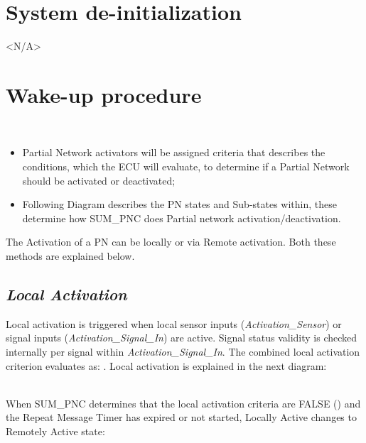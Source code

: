 \section{System de-initialization}
<N/A>
\newline
\section{Wake-up procedure}
\\
\begin{itemize}
	\item Partial Network activators will be assigned criteria that describes the conditions, which the ECU will evaluate, to determine if a Partial Network should be activated or deactivated;
	\item Following Diagram describes the PN states and Sub-states within, these determine how SUM_PNC does Partial network activation/deactivation.
\end{itemize}
\noindent
The Activation of a PN can be locally or via Remote activation. Both these methods are explained below.


\subsection{\textit{Local Activation}}
\label{subsection:LocalActivation}

Local activation is triggered when local sensor inputs (\textit{Activation\_Sensor}) or signal inputs (\textit{Activation\_Signal\_In}) are active. Signal status validity is checked internally per signal within \textit{Activation\_Signal\_In}. The combined local activation criterion evaluates as: . Local activation is explained in the next diagram:


        

\\
When SUM\_PNC determines that the local activation criteria are FALSE () and the Repeat Message Timer has expired or not started, Locally Active changes to Remotely Active state:
	

